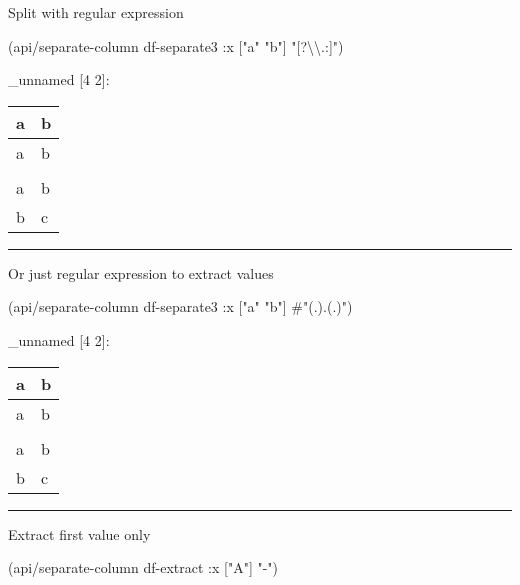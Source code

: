\documentclass[]{article}
\newenvironment{Shaded}{\begin{snugshade}}{\end{snugshade}}
\newcommand{\AttributeTok}[1]{\textcolor[rgb]{0.77,0.63,0.00}{#1}}
\newcommand{\NormalTok}[1]{#1}
\newcommand{\SpecialCharTok}[1]{\textcolor[rgb]{0.00,0.00,0.00}{#1}}
\newcommand{\SpecialStringTok}[1]{\textcolor[rgb]{0.31,0.60,0.02}{#1}}
\newcommand{\StringTok}[1]{\textcolor[rgb]{0.31,0.60,0.02}{#1}}
\begin{document}
Split with regular expression

\begin{Shaded}
\begin{Highlighting}[]
\NormalTok{(api/separate-column df-separate3 }\AttributeTok{:x}\NormalTok{ [}\StringTok{"a"} \StringTok{"b"}\NormalTok{] }\StringTok{"[?}\SpecialCharTok{\textbackslash{}\textbackslash{}}\StringTok{.:]"}\NormalTok{)}
\end{Highlighting}
\end{Shaded}

\_unnamed {[}4 2{]}:

\begin{longtable}[]{@{}ll@{}}
\toprule
a & b\tabularnewline
\midrule
\endhead
a & b\tabularnewline
&\tabularnewline
a & b\tabularnewline
b & c\tabularnewline
\bottomrule
\end{longtable}

\begin{center}\rule{0.5\linewidth}{0.5pt}\end{center}

Or just regular expression to extract values

\begin{Shaded}
\begin{Highlighting}[]
\NormalTok{(api/separate-column df-separate3 }\AttributeTok{:x}\NormalTok{ [}\StringTok{"a"} \StringTok{"b"}\NormalTok{] }\SpecialStringTok{#"(.).(.)"}\NormalTok{)}
\end{Highlighting}
\end{Shaded}

\_unnamed {[}4 2{]}:

\begin{longtable}[]{@{}ll@{}}
\toprule
a & b\tabularnewline
\midrule
\endhead
a & b\tabularnewline
&\tabularnewline
a & b\tabularnewline
b & c\tabularnewline
\bottomrule
\end{longtable}

\begin{center}\rule{0.5\linewidth}{0.5pt}\end{center}

Extract first value only

\begin{Shaded}
\begin{Highlighting}[]
\NormalTok{(api/separate-column df-extract }\AttributeTok{:x}\NormalTok{ [}\StringTok{"A"}\NormalTok{] }\StringTok{"-"}\NormalTok{)}
\end{Highlighting}
\end{Shaded}
\end{document}
